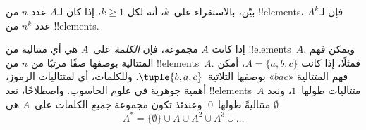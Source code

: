 \documentclass[../../../include/open-logic-section]{subfiles}
\begin{document}
\begin{prob}
بيّن، بالاستقراء على~$k$، أنه لكل $k \ge 1$، إذا كان لـ$A$ عدد $n$
من !!{element}s، فإن لـ$A^k$ عدد $n^k$ من !!{element}s.
\end{prob}

\begin{ex}
إذا كانت $A$ مجموعة، فإن \emph{الكلمة} على~$A$ هي أي متتالية من
!!{element}s~$A$. ويمكن فهم المتتالية بوصفها صفًا مرتبًا من $n$ من
!!{element}s~$A$. فمثلًا، إذا كانت $A = \{a, b, c\}$، أمكن فهم
المتتالية «$bac$» بوصفها الثلاثية~$\tuple{b, a, c}$. وللكلمات، أي
لمتتاليات الرموز، أهمية جوهرية في علوم الحاسوب. واصطلاحًا، نعد
!!{element}s~$A$ متتاليات طولها~$1$، ونعد $\emptyset$ متتاليةً
طولها~$0$. وعندئذ تكون مجموعة \emph{جميع} الكلمات على~$A$ هي
\[
A^* = \{\emptyset\} \cup A \cup A^2 \cup A^3 \cup \dots
\]
\end{ex}
\end{document}
